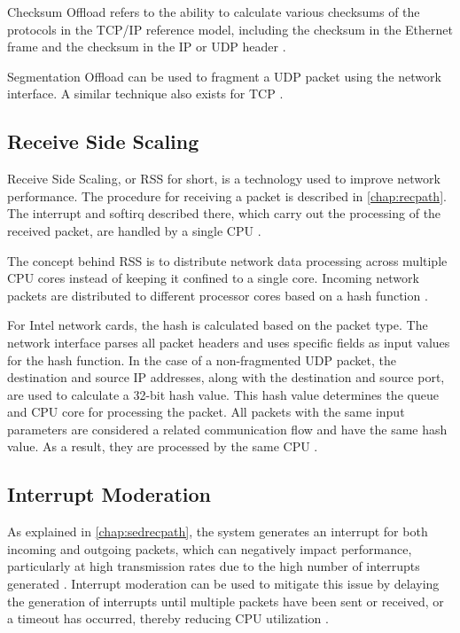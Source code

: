 Checksum Offload refers to the ability to calculate various checksums of the protocols in the TCP/IP reference model, including the checksum in the Ethernet frame and the checksum in the IP or UDP header \cite{tuning02}.

Segmentation Offload can be used to fragment a UDP packet using the network interface. A similar technique also exists for TCP \cite{tuning03}.


\subsection{Receive Side Scaling} \label{chap:ReceiveSideScaling}
Receive Side Scaling, or RSS for short, is a technology used to improve network performance. The procedure for receiving a packet is described in \ref{chap:recpath}. The interrupt and softirq described there, which carry out the processing of the received packet, are handled by a single CPU \cite{rss01}.

The concept behind RSS is to distribute network data processing across multiple CPU cores instead of keeping it confined to a single core. Incoming network packets are distributed to different processor cores based on a hash function \cite{rss02}.

For Intel network cards, the hash is calculated based on the packet type. The network interface parses all packet headers and uses specific fields as input values for the hash function. In the case of a non-fragmented UDP packet, the destination and source IP addresses, along with the destination and source port, are used to calculate a 32-bit hash value. This hash value determines the queue and CPU core for processing the packet. All packets with the same input parameters are considered a related communication flow and have the same hash value. As a result, they are processed by the same CPU \cite{rss03}.

\subsection{Interrupt Moderation} \label{chap:InterMod}
As explained in \ref{chap:sedrecpath}, the system generates an interrupt for both incoming and outgoing packets, which can negatively impact performance, particularly at high transmission rates due to the high number of interrupts generated \cite{intermod01}. Interrupt moderation can be used to mitigate this issue by delaying the generation of interrupts until multiple packets have been sent or received, or a timeout has occurred, thereby reducing CPU utilization \cite{intermod02}.

